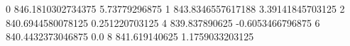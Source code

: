 0 846.1810302734375 5.73779296875
1 843.8346557617188 3.39141845703125
2 840.6944580078125 0.251220703125
4 839.837890625 -0.6053466796875
6 840.4432373046875 0.0
8 841.619140625 1.1759033203125
